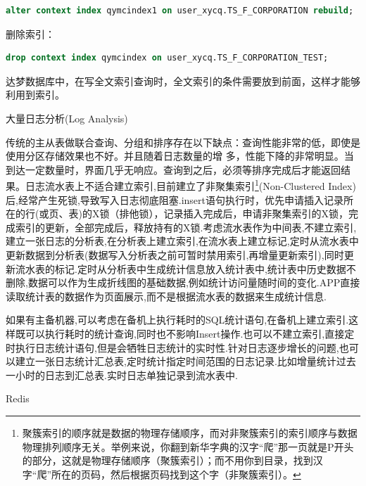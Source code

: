 \documentclass[12pt]{book}
\makeatletter
\numberwithin{dummy}{section}
\theoremstyle{ocrenumbox}
\theoremstyle{blacknumex}
\theoremstyle{blacknumbox}
\theoremstyle{ocrenum}
\renewcommand{\section}{\@startsection{section}{1}{\z@}
	{-4ex \@plus -1ex \@minus -.4ex}
	{1ex \@plus.2ex }
	{\normalfont\large\sffamily\bfseries}}
\renewcommand{\subsection}{\@startsection {subsection}{2}{\z@}
	{-3ex \@plus -0.1ex \@minus -.4ex}
	{0.5ex \@plus.2ex }
	{\normalfont\sffamily\bfseries}}
\makeatother
\begin{document}
\begin{lstlisting}[language=SQL]
alter context index qymcindex1 on user_xycq.TS_F_CORPORATION rebuild;
\end{lstlisting}

删除索引：

\begin{lstlisting}[language=SQL]
drop context index qymcindex on user_xycq.TS_F_CORPORATION_TEST;
\end{lstlisting}

达梦数据库中，在写全文索引查询时，全文索引的条件需要放到前面，这样才能够利用到索引。

\subsection{大量日志分析(Log Analysis)}

传统的主从表做联合查询、分组和排序存在以下缺点：查询性能非常的低，即使是使用分区存储效果也不好。并且随着日志数量的增 多，性能下降的非常明显。当到达一定数量时，界面几乎无响应。查询到之后，必须等排序完成后才能返回结果。日志流水表上不适合建立索引,目前建立了非聚集索引\footnote{聚簇索引的顺序就是数据的物理存储顺序，而对非聚簇索引的索引顺序与数据物理排列顺序无关。举例来说，你翻到新华字典的汉字“爬”那一页就是P开头的部分，这就是物理存储顺序（聚簇索引）；而不用你到目录，找到汉字“爬”所在的页码，然后根据页码找到这个字（非聚簇索引）。}(Non-Clustered Index)后,经常产生死锁,导致写入日志彻底阻塞.insert语句执行时，优先申请插入记录所在的行(或页、表)的X锁（排他锁），记录插入完成后，申请非聚集索引的X锁，完成索引的更新，全部完成后，释放持有的X锁.考虑流水表作为中间表,不建立索引,建立一张日志的分析表,在分析表上建立索引,在流水表上建立标记,定时从流水表中更新数据到分析表(数据写入分析表之前可暂时禁用索引,再增量更新索引),同时更新流水表的标记.定时从分析表中生成统计信息放入统计表中,统计表中历史数据不删除,数据可以作为生成折线图的基础数据,例如统计访问量随时间的变化.APP直接读取统计表的数据作为页面展示,而不是根据流水表的数据来生成统计信息.

如果有主备机器,可以考虑在备机上执行耗时的SQL统计语句,在备机上建立索引.这样既可以执行耗时的统计查询,同时也不影响Insert操作\cite{highperformancesql}.也可以不建立索引,直接定时执行日志统计语句,但是会牺牲日志统计的实时性.针对日志逐步增长的问题,也可以建立一张日志统计汇总表,定时统计指定时间范围的日志记录.比如增量统计过去一小时的日志到汇总表.实时日志单独记录到流水表中.



\section{Redis}
\end{document}
